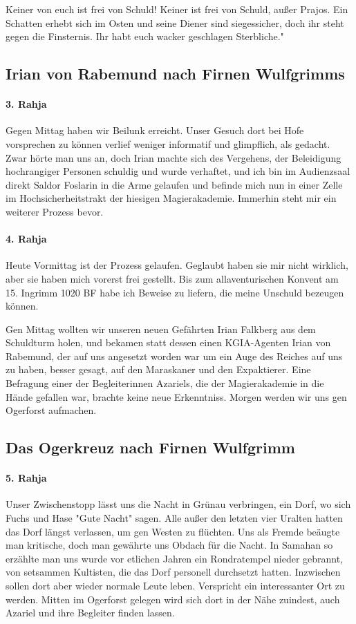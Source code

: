 Keiner von euch ist frei von Schuld! Keiner ist frei von Schuld, außer Prajos. Ein Schatten erhebt sich im Osten und seine Diener sind siegessicher, doch ihr steht gegen die Finsternis. Ihr habt euch wacker geschlagen Sterbliche."

\subsection{Irian von Rabemund nach Firnen Wulfgrimms}
\paragraph{3. Rahja}
Gegen Mittag haben wir Beilunk erreicht. Unser Gesuch dort bei Hofe vorsprechen zu können verlief weniger informatif und glimpflich, als gedacht. Zwar hörte man uns an, doch Irian machte sich des Vergehens, der Beleidigung hochrangiger Personen schuldig und wurde verhaftet, und ich bin im Audienzsaal direkt Saldor Foslarin in die Arme gelaufen und befinde mich nun in einer Zelle im Hochsicherheitstrakt der hiesigen Magierakademie. Immerhin steht mir ein weiterer Prozess bevor.

\paragraph{4. Rahja}
Heute Vormittag ist der Prozess gelaufen. Geglaubt haben sie mir nicht wirklich, aber sie haben mich vorerst frei gestellt. Bis zum allaventurischen Konvent am 15. Ingrimm 1020 BF habe ich Beweise zu liefern, die meine Unschuld bezeugen können.

Gen Mittag wollten wir unseren neuen Gefährten Irian Falkberg aus dem Schuldturm holen, und bekamen statt dessen einen KGIA-Agenten Irian von Rabemund, der auf uns angesetzt worden war um ein Auge des Reiches auf uns zu haben, besser gesagt, auf den Maraskaner und den Expaktierer. Eine Befragung einer der Begleiterinnen Azariels, die der Magierakademie in die Hände gefallen war, brachte keine neue Erkenntniss. Morgen werden wir uns gen Ogerforst aufmachen.

\subsection{Das Ogerkreuz nach Firnen Wulfgrimm}
\paragraph{5. Rahja}
Unser Zwischenstopp lässt uns die Nacht in Grünau verbringen, ein Dorf, wo sich Fuchs und Hase "Gute Nacht" sagen. Alle außer den letzten vier Uralten hatten das Dorf längst verlassen, um gen Westen zu flüchten. Uns als Fremde beäugte man kritische, doch man gewährte uns Obdach für die Nacht. In Samahan so erzählte man uns wurde vor etlichen Jahren ein Rondratempel nieder gebrannt, von setsammen Kultisten, die das Dorf personell durchsetzt hatten. Inzwischen sollen dort aber wieder normale Leute leben. Verspricht ein interessanter Ort zu werden. Mitten im Ogerforst gelegen wird sich dort in der Nähe zuindest, auch Azariel und ihre Begleiter finden lassen.

